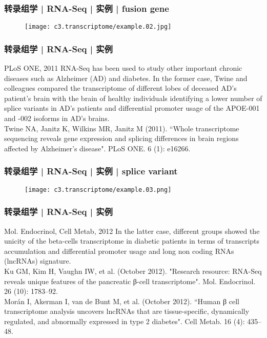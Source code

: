 \begin{frame}
  \frametitle{转录组学 | RNA-Seq | 实例 | fusion gene}
  \begin{figure}
    \centering
    \texttt{[image: c3.transcriptome/example.02.jpg]}
  \end{figure}
\end{frame}

\begin{frame}
  \frametitle{转录组学 | RNA-Seq | 实例}
  \begin{block}{PLoS ONE, 2011}
  RNA-Seq has been used to study other important chronic diseases such as Alzheimer (AD) and diabetes. In the former case, Twine and colleagues compared the transcriptome of different lobes of deceased AD's patient's brain with the brain of healthy individuals identifying a lower number of splice variants in AD's patients and differential promoter usage of the APOE-001 and -002 isoforms in AD's brains.\\
  \vspace{0.5em}
Twine NA, Janitz K, Wilkins MR, Janitz M (2011). ``Whole transcriptome sequencing reveals gene expression and splicing differences in brain regions affected by Alzheimer's disease". PLoS ONE. 6 (1): e16266. 
  \end{block}
\end{frame}

\begin{frame}
  \frametitle{转录组学 | RNA-Seq | 实例 | splice variant}
  \begin{figure}
    \centering
    \texttt{[image: c3.transcriptome/example.03.png]}
  \end{figure}
\end{frame}

\begin{frame}
  \frametitle{转录组学 | RNA-Seq | 实例}
  \begin{block}{Mol. Endocrinol, Cell Metab, 2012}
  In the latter case, different groups showed the unicity of the beta-cells transcriptome in diabetic patients in terms of transcripts accumulation and differential promoter usage and long non coding RNAs (lncRNAs) signature.\\
  \vspace{0.5em}
  Ku GM, Kim H, Vaughn IW, et al. (October 2012). "Research resource: RNA-Seq reveals unique features of the pancreatic β-cell transcriptome". Mol. Endocrinol. 26 (10): 1783–92.\\
  \vspace{0.5em}
  Morán I, Akerman I, van de Bunt M, et al. (October 2012). ``Human β cell transcriptome analysis uncovers lncRNAs that are tissue-specific, dynamically regulated, and abnormally expressed in type 2 diabetes". Cell Metab. 16 (4): 435–48. 
  \end{block}
\end{frame}

